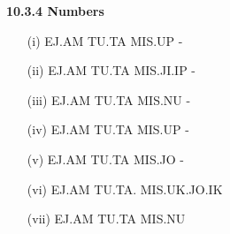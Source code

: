 \noindent \textbf{10.3.4 Numbers} 
\begin{itemize}
    \item[(i)]EJ.AM TU.TA MIS.UP - \ej\am \tu\ta \mis\up 

    \item[(ii)]EJ.AM TU.TA MIS.JI.IP - \ej\am \tu\ta \mis\ji\ip 

    \item[(iii)]EJ.AM TU.TA MIS.NU - \ej\am \tu\ta \mis\Atlannu 

\item[(iv)] EJ.AM TU.TA MIS.UP  - \ej\am \tu\ta \mis\up 

    \item[(v)] EJ.AM TU.TA MIS.JO - \ej\am \tu\ta \mis\jo 

    \item[(vi)] EJ.AM TU.TA. MIS.UK.JO.IK 

\item[]\ej\am \tu\ta \mis\uk\jo\ik 

    \item[(vii)] EJ.AM TU.TA MIS.NU \ej\am \tu\ta \mis\Atlannu
\end{itemize}
